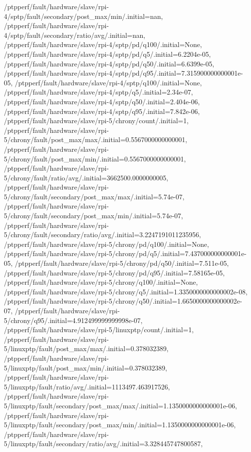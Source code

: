 {    /ptpperf/fault/hardware/slave/rpi-4/sptp/fault/secondary/post_max/min/.initial=nan,
    /ptpperf/fault/hardware/slave/rpi-4/sptp/fault/secondary/ratio/avg/.initial=nan,
    /ptpperf/fault/hardware/slave/rpi-4/sptp/pd/q100/.initial=None,
    /ptpperf/fault/hardware/slave/rpi-4/sptp/pd/q5/.initial=6.2204e-05,
    /ptpperf/fault/hardware/slave/rpi-4/sptp/pd/q50/.initial=6.6399e-05,
    /ptpperf/fault/hardware/slave/rpi-4/sptp/pd/q95/.initial=7.315900000000001e-05,
    /ptpperf/fault/hardware/slave/rpi-4/sptp/q100/.initial=None,
    /ptpperf/fault/hardware/slave/rpi-4/sptp/q5/.initial=2.34e-07,
    /ptpperf/fault/hardware/slave/rpi-4/sptp/q50/.initial=2.404e-06,
    /ptpperf/fault/hardware/slave/rpi-4/sptp/q95/.initial=7.842e-06,
    /ptpperf/fault/hardware/slave/rpi-5/chrony/count/.initial=1,
    /ptpperf/fault/hardware/slave/rpi-5/chrony/fault/post_max/max/.initial=0.5567000000000001,
    /ptpperf/fault/hardware/slave/rpi-5/chrony/fault/post_max/min/.initial=0.5567000000000001,
    /ptpperf/fault/hardware/slave/rpi-5/chrony/fault/ratio/avg/.initial=3662500.0000000005,
    /ptpperf/fault/hardware/slave/rpi-5/chrony/fault/secondary/post_max/max/.initial=5.74e-07,
    /ptpperf/fault/hardware/slave/rpi-5/chrony/fault/secondary/post_max/min/.initial=5.74e-07,
    /ptpperf/fault/hardware/slave/rpi-5/chrony/fault/secondary/ratio/avg/.initial=3.2247191011235956,
    /ptpperf/fault/hardware/slave/rpi-5/chrony/pd/q100/.initial=None,
    /ptpperf/fault/hardware/slave/rpi-5/chrony/pd/q5/.initial=7.437000000000001e-05,
    /ptpperf/fault/hardware/slave/rpi-5/chrony/pd/q50/.initial=7.511e-05,
    /ptpperf/fault/hardware/slave/rpi-5/chrony/pd/q95/.initial=7.58165e-05,
    /ptpperf/fault/hardware/slave/rpi-5/chrony/q100/.initial=None,
    /ptpperf/fault/hardware/slave/rpi-5/chrony/q5/.initial=1.3350000000000002e-08,
    /ptpperf/fault/hardware/slave/rpi-5/chrony/q50/.initial=1.6650000000000002e-07,
    /ptpperf/fault/hardware/slave/rpi-5/chrony/q95/.initial=4.912499999999998e-07,
    /ptpperf/fault/hardware/slave/rpi-5/linuxptp/count/.initial=1,
    /ptpperf/fault/hardware/slave/rpi-5/linuxptp/fault/post_max/max/.initial=0.378032389,
    /ptpperf/fault/hardware/slave/rpi-5/linuxptp/fault/post_max/min/.initial=0.378032389,
    /ptpperf/fault/hardware/slave/rpi-5/linuxptp/fault/ratio/avg/.initial=1113497.463917526,
    /ptpperf/fault/hardware/slave/rpi-5/linuxptp/fault/secondary/post_max/max/.initial=1.1350000000000001e-06,
    /ptpperf/fault/hardware/slave/rpi-5/linuxptp/fault/secondary/post_max/min/.initial=1.1350000000000001e-06,
    /ptpperf/fault/hardware/slave/rpi-5/linuxptp/fault/secondary/ratio/avg/.initial=3.328445747800587,
}
